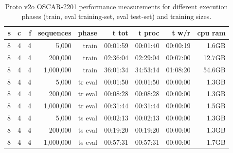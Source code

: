 \begin{table}[H]
\centering
\caption{Proto v2o OSCAR-2201 performance measurements for different execution phases (train, eval training-set, eval test-set) and training sizes.}
\label{tab:protov2o-oscar-performance-inferenceLeakyIntegrateAndFire}
\begin{tabular}{rrrrrrrrr}
\toprule
\textbf{s} & \textbf{c} & \textbf{f} & \textbf{sequences} & \textbf{phase} & \textbf{t tot} & \textbf{t proc} & \textbf{t w/r} & \textbf{cpu ram} \\
\midrule
8 & 4 & 4 & 5,000       & train   & 00:01:59 & 00:01:40 & 00:00:19 & 1.6GB \\
8 & 4 & 4 & 200,000     & train   & 02:36:04 & 02:29:04 & 00:07:00 & 12.7GB \\
8 & 4 & 4 & 1,000,000   & train   & 36:01:34 & 34:53:14 & 01:08:20 & 54.6GB \\
8 & 4 & 4 & 5,000       & tr eval & 00:01:50 & 00:01:50 & 00:00:00 & 1.3GB \\
8 & 4 & 4 & 200,000     & tr eval & 00:08:28 & 00:08:28 & 00:00:00 & 1.3GB \\
8 & 4 & 4 & 1,000,000   & tr eval & 00:31:44 & 00:31:44 & 00:00:00 & 1.5GB \\
8 & 4 & 4 & 5,000       & ts eval & 00:02:13 & 00:02:13 & 00:00:00 & 1.3GB \\
8 & 4 & 4 & 200,000     & ts eval & 00:19:20 & 00:19:20 & 00:00:00 & 1.3GB \\
8 & 4 & 4 & 1,000,000   & ts eval & 00:57:31 & 00:57:31 & 00:00:00 & 1.7GB \\
\bottomrule
\end{tabular}
\end{table}

